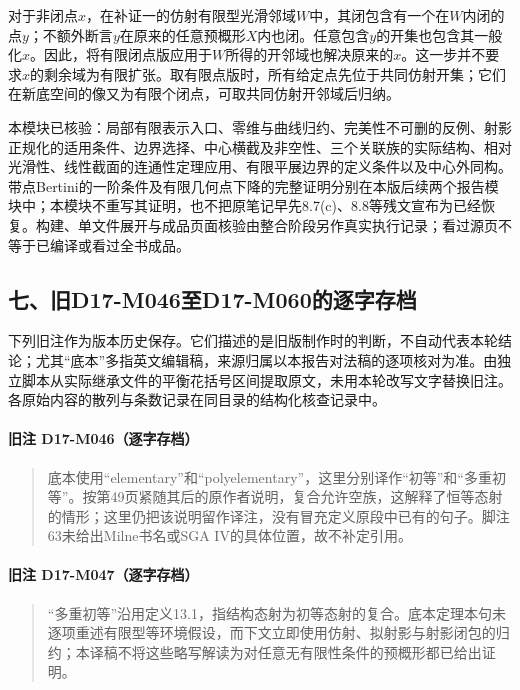 对于非闭点$x$，在补证一的仿射有限型光滑邻域$W$中，其闭包含有一个在$W$内闭的点$y$；不额外断言$y$在原来的任意预概形$X$内也闭。任意包含$y$的开集也包含其一般化$x$。因此，将有限闭点版应用于$W$所得的开邻域也解决原来的$x$。这一步并不要求$x$的剩余域为有限扩张。取有限点版时，所有给定点先位于共同仿射开集；它们在新底空间的像又为有限个闭点，可取共同仿射开邻域后归纳。

本模块已核验：局部有限表示入口、零维与曲线归约、完美性不可删的反例、射影正规化的适用条件、边界选择、中心横截及非空性、三个关联族的实际结构、相对光滑性、线性截面的连通性定理应用、有限平展边界的定义条件以及中心外同构。带点Bertini的一阶条件及有限几何点下降的完整证明分别在本版后续两个报告模块中；本模块不重写其证明，也不把原笔记早先8.7(c)、8.8等残文宣布为已经恢复。构建、单文件展开与成品页面核验由整合阶段另作真实执行记录；看过源页不等于已编译或看过全书成品。

\subsection*{七、旧D17-M046至D17-M060的逐字存档}

下列旧注作为版本历史保存。它们描述的是旧版制作时的判断，不自动代表本轮结论；尤其“底本”多指英文编辑稿，来源归属以本报告对法稿的逐项核对为准。由独立脚本从实际继承文件的平衡花括号区间提取原文，未用本轮改写文字替换旧注。各原始内容的散列与条数记录在同目录的结构化核查记录中。

\paragraph*{旧注 D17-M046（逐字存档）}
\begin{quote}
底本使用“elementary”和“polyelementary”，这里分别译作“初等”和“多重初等”。按第49页紧随其后的原作者说明，复合允许空族，这解释了恒等态射的情形；这里仍把该说明留作译注，没有冒充定义原段中已有的句子。脚注63未给出Milne书名或SGA IV的具体位置，故不补定引用。
\end{quote}

\paragraph*{旧注 D17-M047（逐字存档）}
\begin{quote}
“多重初等”沿用定义13.1，指结构态射为初等态射的复合。底本定理本句未逐项重述有限型等环境假设，而下文立即使用仿射、拟射影与射影闭包的归约；本译稿不将这些略写解读为对任意无有限性条件的预概形都已给出证明。
\end{quote}


